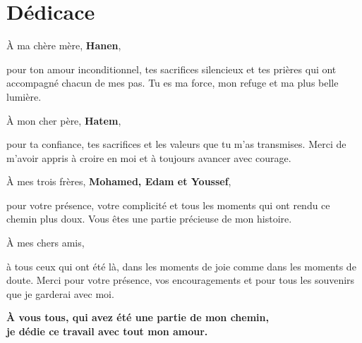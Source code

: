 \chapter*{Dédicace}
\thispagestyle{empty}

\vspace*{1.5cm}

\begin{center}
\itshape

À ma chère mère, \textbf{Hanen},

pour ton amour inconditionnel, tes sacrifices silencieux
et tes prières qui ont accompagné chacun de mes pas.
Tu es ma force, mon refuge et ma plus belle lumière.

\vspace{0.7cm}

À mon cher père, \textbf{Hatem},

pour ta confiance, tes sacrifices et les valeurs
que tu m’as transmises.
Merci de m’avoir appris à croire en moi
et à toujours avancer avec courage.

\vspace{0.7cm}

À mes trois frères, \textbf{Mohamed, Edam et Youssef},

pour votre présence, votre complicité et tous les moments
qui ont rendu ce chemin plus doux.
Vous êtes une partie précieuse de mon histoire.

\vspace{0.7cm}

À mes chers amis,

à tous ceux qui ont été là, dans les moments de joie
comme dans les moments de doute.
Merci pour votre présence, vos encouragements
et pour tous les souvenirs que je garderai avec moi.

\vspace{0.8cm}

\textbf{À vous tous, qui avez été une partie de mon chemin,\\
je dédie ce travail avec tout mon amour.}

\end{center}
